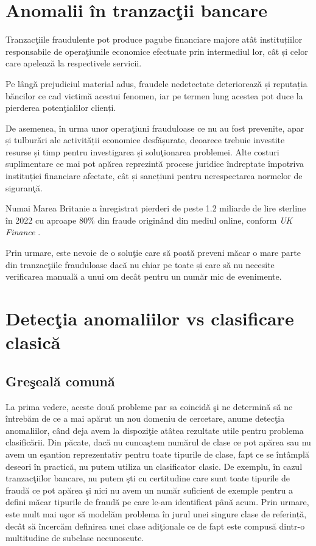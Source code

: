 \section{Anomalii în tranzacţii bancare}

Tranzacţiile fraudulente pot produce pagube financiare majore 
atât instituțiilor responsabile de operaţiunile economice 
efectuate prin intermediul lor, cât și celor care apelează
la respectivele servicii. 

Pe lângă prejudiciul material adus,
fraudele nedetectate deteriorează și reputația băncilor 
ce cad victimă acestui fenomen, iar pe termen lung acestea
pot duce la pierderea potenţialilor clienți.

De asemenea, în urma unor operaţiuni frauduloase ce nu au 
fost prevenite, apar și tulburări ale activității economice
desfășurate, deoarece trebuie investite resurse și timp 
pentru investigarea și soluţionarea problemei. Alte costuri
suplimentare ce mai pot apărea reprezintă procese juridice 
îndreptate împotriva instituției financiare afectate, cât și 
sancțiuni pentru nerespectarea normelor de siguranţă.

Numai Marea Britanie a înregistrat pierderi de peste 1.2 
miliarde de lire sterline în 2022 cu aproape 80\% din fraude
originând din mediul online, conform \textit{UK Finance}
\cite{uk-finance}.

Prin urmare, este nevoie de o soluţie care să poată 
preveni măcar o mare parte din tranzacţiile frauduloase dacă
nu chiar pe toate și care să nu necesite verificarea manuală
a unui om decât pentru un număr mic de evenimente.


\section{Detecţia anomaliilor vs clasificare clasică}

\subsection{Greşeală comună}

La prima vedere, aceste două probleme par sa coincidă şi ne determină
să ne întrebăm de ce a mai apărut un nou domeniu de cercetare, anume detecţia
anomaliilor, când deja avem la dispoziţie atâtea rezultate utile pentru 
problema clasificării. Din păcate, dacă nu cunoaştem numărul de clase ce pot apărea 
sau nu avem un eşantion reprezentativ pentru toate tipurile de clase, fapt ce se 
întâmplă deseori în practică, nu putem utiliza un clasificator clasic. De exemplu, 
în cazul tranzacţiilor bancare, nu putem şti cu certitudine care sunt toate 
tipurile de fraudă ce pot apărea şi nici nu avem un număr suficient de exemple 
pentru a defini măcar tipurile de fraudă pe care le-am identificat până acum.
Prin urmare, este mult mai uşor să modelăm problema în jurul unei singure clase 
de referință, decât să încercăm definirea unei clase adiţionale ce de fapt 
este compusă dintr-o multitudine de subclase necunoscute.


